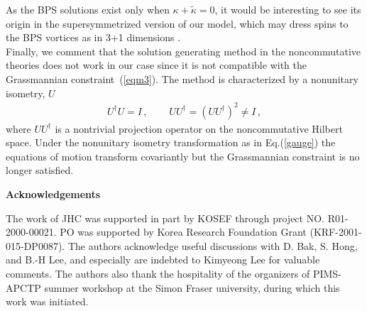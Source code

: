 \documentclass[a4paper,12pt]{article}
\begin{document}
As the BPS solutions exist only when $\kappa+\tilde\kappa=0$, it would be interesting to see its origin in the
supersymmetrized version of our model, which may dress spins to the BPS vortices as in 3+1 dimensions \cite{ho}.
\\






Finally, we comment that  the solution generating method in the noncommutative theories \cite{harv}  does not work
in our case since it is not compatible with the Grassmannian constraint~(\ref{eqm3}). The method is characterized
by  a nonunitary isometry, $U$
\begin{equation}
\begin{array}{ll}
U^{\dagger}U=I\,,~~~&~~~UU^{\dagger}=(UU^{\dagger})^{2}\neq I\,,
\end{array}
\end{equation}
where $UU^{\dagger}$ is a nontrivial projection operator on the noncommutative  Hilbert space.   Under
the nonunitary isometry  transformation as in Eq.(\ref{gauge}) the equations of   motion transform covariantly but
the Grassmannian constraint is no longer satisfied.
\newpage
~\newline
\newline
\begin{center}
{\large\bf Acknowledgements}
\end{center}
The work of JHC was supported in part by KOSEF through project NO. R01-2000-00021. PO was supported by Korea Research Foundation Grant
(KRF-2001-015-DP0087). The authors acknowledge useful discussions with D. Bak, S. Hong, and B.-H Lee, and especially are indebted to Kimyeong Lee for
valuable comments. The authors also thank the hospitality of the organizers of PIMS-APCTP summer workshop at the Simon Fraser university, during
which this work was initiated.
\newpage
\end{document}

